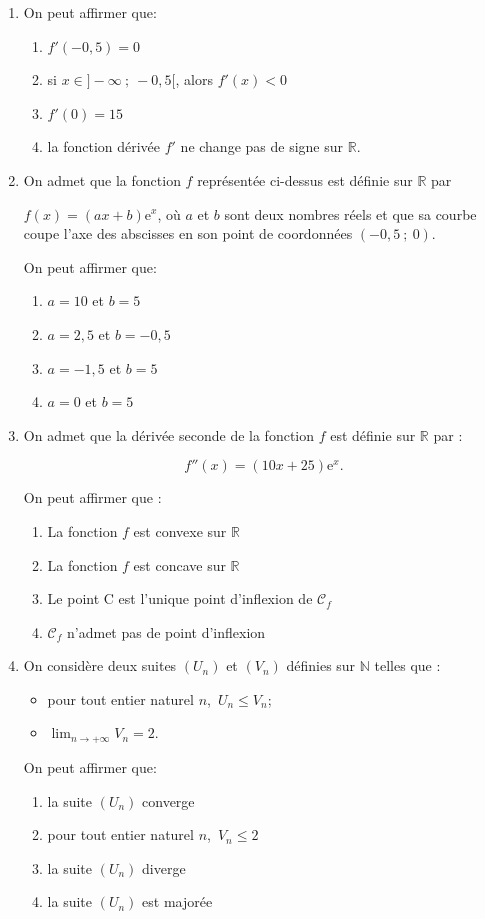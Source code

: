 \documentclass[10pt]{article}
\providecommand{\R}{\mathbb{R}}
\providecommand{\N}{\mathbb{N}}
\begin{document}
\begin{enumerate}
\item On peut affirmer que:
	\begin{enumerate}
		\item $f'(-0,5) = 0$
		\item si $x \in ]- \infty~;~-0,5[$, alors $f'(x) < 0$
		\item $f'(0) = 15$
		\item la fonction dérivée $f'$ ne change pas de
signe sur $\R$.
	\end{enumerate}
\item On admet que la fonction $f$ représentée ci-dessus est définie sur $\R$ par 

$f(x) = (ax + b)\text{e}^x$, où $a$ et $b$ sont deux nombres réels et que sa courbe coupe l'axe des abscisses en son point de coordonnées $(-0,5~;~ 0)$.

On peut affirmer que:
	\begin{enumerate}
		\item $a = 10$ et $b = 5$
		\item $a = 2,5$ et $b = -0,5$
		\item $a = -1,5$ et $b = 5$
		\item $a = 0$ et $b = 5$
	\end{enumerate}
\item On admet que la dérivée seconde de la fonction $f$ est définie sur $\R$ par : 

\[f''(x) = (10x + 25)\text{e}^x.\]

On peut affirmer que :
	\begin{enumerate}
		\item La fonction $f$ est convexe sur $\R$
		\item La fonction $f$ est concave sur $\R$
		\item Le point C est l'unique point d'inflexion de $\mathcal{C}_f$
		\item $\mathcal{C}_f$ n'admet pas de point d'inflexion
	\end{enumerate}
\item On considère deux suites $\left(U_n\right)$ et  $\left(V_n\right)$ définies sur $\N$ telles que : 

\setlength\parindent{1cm}
\begin{itemize}
\item[$\bullet~~$] pour tout entier naturel $n$,\, $U_n \leqslant V_n$;
\item[$\bullet~~$] $\displaystyle\lim_{n \to+ \infty}  V_n= 2$.
\end{itemize}
\setlength\parindent{0cm}

On peut affirmer que:

	\begin{enumerate}
		\item la suite $\left(U_n\right)$ converge 
		\item pour tout entier naturel $n$,\, $V_n \leqslant 2$		
		\item la suite $\left(U_n\right)$ diverge
		\item la suite $\left(U_n\right)$ est majorée
	\end{enumerate} 
\end{enumerate}

\bigskip
\end{document}
